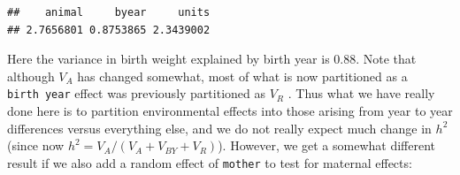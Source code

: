 \documentclass[
  12pt,
]{book}
\newenvironment{Shaded}{\begin{snugshade}}{\end{snugshade}}
\newcommand{\DataTypeTok}[1]{\textcolor[rgb]{0.13,0.29,0.53}{#1}}
\newcommand{\DecValTok}[1]{\textcolor[rgb]{0.00,0.00,0.81}{#1}}
\newcommand{\FloatTok}[1]{\textcolor[rgb]{0.00,0.00,0.81}{#1}}
\newcommand{\KeywordTok}[1]{\textcolor[rgb]{0.13,0.29,0.53}{\textbf{#1}}}
\newcommand{\NormalTok}[1]{#1}
\newcommand{\OperatorTok}[1]{\textcolor[rgb]{0.81,0.36,0.00}{\textbf{#1}}}
\newcommand{\OtherTok}[1]{\textcolor[rgb]{0.56,0.35,0.01}{#1}}
\newcommand{\StringTok}[1]{\textcolor[rgb]{0.31,0.60,0.02}{#1}}
\begin{document}
\begin{verbatim}
##    animal     byear     units 
## 2.7656801 0.8753865 2.3439002
\end{verbatim}

Here the variance in birth weight explained by birth year is 0.88. Note that although \(V_A\) has changed somewhat, most of what is now partitioned as a \texttt{birth\ year} effect was previously partitioned as \(V_R\) . Thus what we have really done here is to partition environmental effects into those arising from year to year differences versus everything else, and we do not really expect much change in \(h^2\) (since now \(h^2 = V_A /(V_A + V_{BY} + V_R )\)). However, we get a somewhat different result if we also add a random effect of \texttt{mother} to test for maternal effects:

\begin{Shaded}
\end{Shaded}
\end{document}

